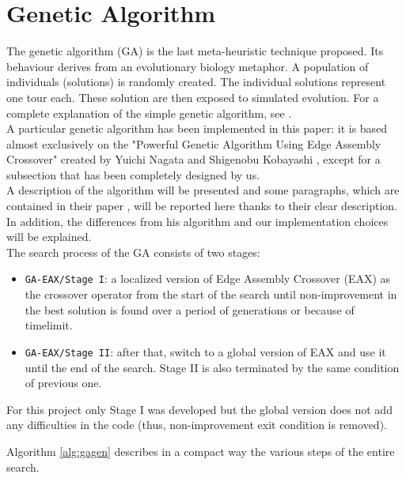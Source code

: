 \section{Genetic Algorithm}
The genetic algorithm (GA) is the last meta-heuristic technique proposed. Its behaviour derives from an evolutionary biology metaphor. A population of individuals (solutions) is randomly created. The individual solutions represent one tour each. These solution are then exposed to simulated evolution.
For a complete explanation of the simple genetic algorithm, see \cite{phdthesis}.\\
A particular genetic algorithm has been implemented in this paper: it is based almost exclusively on the "Powerful Genetic Algorithm Using Edge Assembly Crossover" created by Yuichi Nagata and Shigenobu Kobayashi \cite{Nagata2013, Honda2013}, except for a subsection that has been completely designed by us.\\ A description of the algorithm will be presented and some paragraphs, which are contained in their paper \cite{Nagata2013}, will be reported here thanks to their clear description. In addition, the differences from his algorithm and our implementation choices will be explained.\\
The search process of the GA consists of two stages: \\
\begin{itemize}
\item \texttt{GA-EAX/Stage I}: a localized version of Edge Assembly Crossover (EAX) as the crossover operator from the start of the search until non-improvement in the best solution is found over a period of generations or because of timelimit.
\item  \texttt{GA-EAX/Stage II}: after that, switch to a global version of EAX and use it until the end of the search. Stage II is also terminated by the same condition of previous one.
\end{itemize}
For this project only Stage I was developed but the global version does not add any difficulties in the code (thus, non-improvement exit condition is removed).

Algorithm \ref{alg:gagen} describes in a compact way the various steps of the entire search.\\

